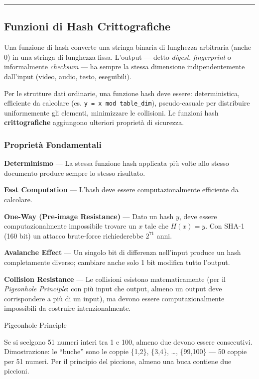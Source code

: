 \documentclass[
  italian,
  openany]{book}
\begin{document}
\begin{center}\rule{0.5\linewidth}{0.5pt}\end{center}

\subsection{Funzioni di Hash
Crittografiche}\label{funzioni-di-hash-crittografiche}

Una funzione di hash converte una stringa binaria di lunghezza
arbitraria (anche 0) in una stringa di lunghezza fissa. L'output ---
detto \emph{digest}, \emph{fingerprint} o informalmente \emph{checksum}
--- ha sempre la stessa dimensione indipendentemente dall'input (video,
audio, testo, eseguibili).

Per le strutture dati ordinarie, una funzione hash deve essere:
deterministica, efficiente da calcolare (es.
\texttt{y\ =\ x\ mod\ table\_dim}), pseudo-casuale per distribuire
uniformemente gli elementi, minimizzare le collisioni. Le funzioni hash
\textbf{crittografiche} aggiungono ulteriori proprietà di sicurezza.

\subsubsection{Proprietà Fondamentali}\label{proprietuxe0-fondamentali}

\textbf{Determinismo} --- La stessa funzione hash applicata più volte
allo stesso documento produce sempre lo stesso risultato.

\textbf{Fast Computation} --- L'hash deve essere computazionalmente
efficiente da calcolare.

\textbf{One-Way (Pre-image Resistance)} --- Dato un hash \(y\), deve
essere computazionalmente impossibile trovare un \(x\) tale che
\(H(x) = y\). Con SHA-1 (160 bit) un attacco brute-force richiederebbe
\(2^{71}\) anni.

\textbf{Avalanche Effect} --- Un singolo bit di differenza nell'input
produce un hash completamente diverso; cambiare anche solo 1 bit
modifica tutto l'output.

\textbf{Collision Resistance} --- Le collisioni esistono matematicamente
(per il \emph{Pigeonhole Principle}: con più input che output, almeno un
output deve corrispondere a più di un input), ma devono essere
computazionalmente impossibili da costruire intenzionalmente.

\begin{callouttip}{Pigeonhole Principle}

Se si scelgono 51 numeri interi tra 1 e 100, almeno due devono essere
consecutivi. Dimostrazione: le ``buche'' sono le coppie \{1,2\},
\{3,4\}, \ldots, \{99,100\} --- 50 coppie per 51 numeri. Per il
principio del piccione, almeno una buca contiene due piccioni.

\end{callouttip}
\end{document}
